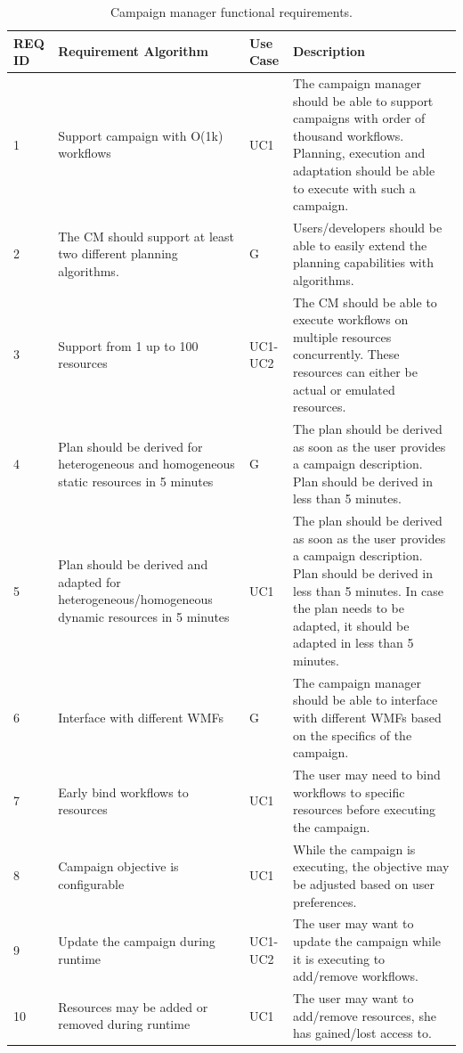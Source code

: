 \begin{table}[t]
    \centering
    \scriptsize
    \begin{tabular}{@{}p{1.5cm}|p{2.8cm}p{1.5cm}p{6cm}@{}}
        \toprule
        \textbf{REQ ID} &\textbf{Requirement Algorithm} &\textbf{Use Case} & \textbf{Description} \\
        \midrule
         1 & 
         Support campaign with O(1k) workflows & 
         UC1 & 
         The campaign manager should be able to support campaigns with order of thousand workflows.
         Planning, execution and adaptation should be able to execute with such a campaign.\\
         2 & 
         The CM should support at least two different planning algorithms. & 
         G & 
         Users/developers should be able to easily extend the planning capabilities with algorithms.\\
         3 & 
         Support from 1 up to 100 resources & 
         UC1-UC2 & 
         The CM should be able to execute workflows on multiple resources concurrently.
         These resources can either be actual or emulated resources.\\
         4 & 
         Plan should be derived for heterogeneous and homogeneous static resources in 5 minutes & 
         G & 
         The plan should be derived as soon as the user provides a campaign description. 
         Plan should be derived in less than 5 minutes.\\
         5 & 
         Plan should be derived and adapted for heterogeneous/homogeneous dynamic resources in 5 minutes & 
         UC1 & 
         The plan should be derived as soon as the user provides a campaign description.
         Plan should be derived in less than 5 minutes.
         In case the plan needs to be adapted, it should be adapted in less than 5 minutes.\\
         6 & 
         Interface with different WMFs & 
         G & 
         The campaign manager should be able to interface with different WMFs based on the specifics of the campaign. \\
         7 & 
         Early bind workflows to resources &
         UC1 &
         The user may need to bind workflows to specific resources before executing the campaign.\\
         8 & 
         Campaign objective is configurable & 
         UC1 & 
         While the campaign is executing, the objective may be adjusted based on user preferences.\\
         9 &
         Update the campaign during runtime &
         UC1-UC2 &
         The user may want to update the campaign while it is executing to add/remove workflows.\\
         10 &
         Resources may be added or removed during runtime & 
         UC1 & 
         The user may want to add/remove resources, she has gained/lost access to.\\
        \bottomrule
    \end{tabular}
    \caption{Campaign manager functional requirements.\label{tab:fun_reqs}}
\end{table}

